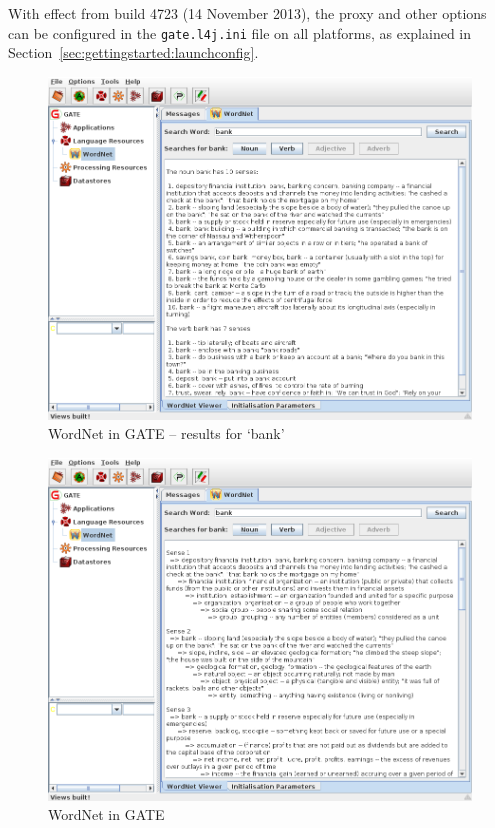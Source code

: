 With effect from build 4723 (14 November 2013), the proxy and other options can
be configured in the \texttt{gate.l4j.ini} file on all platforms, as explained
in Section~\ref{sec:gettingstarted:launchconfig}.
%
\begin{figure}[htb]
\begin{center}
\includegraphics[scale=0.5]{wordnet1.png}
\end{center}
\caption{WordNet in GATE -- results for `bank'}
\label{fig:wordnet1}
\end{figure}
%
%
\begin{figure}
\begin{center}
\includegraphics[scale=0.5]{wordnet3.png}
\end{center}
\caption{WordNet in GATE}
\label{fig:wordnet3}
\end{figure}
